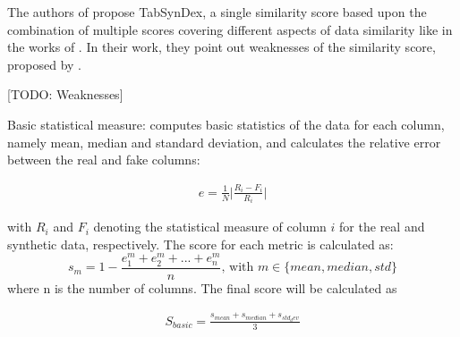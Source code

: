 The authors of \cite{chundawat2022UniversalMetricRobust} propose TabSynDex, a single similarity score based upon the combination of multiple scores covering different aspects of data similarity like in the works of \cite{brenninkmeijer2019GenerationEvaluationTabular}.
In their work, they point out weaknesses of the similarity score, proposed by \cite{brenninkmeijer2019GenerationEvaluationTabular}.

[TODO: Weaknesses]


\begin{description}
  \item Basic statistical measure:
  computes basic statistics of the data for each column, namely mean, median and standard deviation, and calculates the relative error between the real and fake columns:
  
  \begin{equation}
    \begin{align*}
      \label{eqn:rel_err}
      e=\frac{1}{N} \bigg| \frac{R_i-F_i}{R_i} \bigg| 
      \end{align*}
  \end{equation}

  with $R_i$ and $F_i$ denoting the statistical measure of column $i$ for the real and synthetic data, respectively.
  The score for each metric is calculated as:
  $$s_m = 1-\frac{e^m_1+e^m_2+...+e^m_n}{n} \textrm{, with }m \in \{mean, median, std\}$$
  where n is the number of columns.
  The final score will be calculated as


  \begin{equation}
    \begin{align*}
      \label{eqn:s_basic}
      S_{basic} = \frac{s_{mean}+s_{median}+s_{std_dev}}{3}
      \end{align*}
  \end{equation}



\end{description}
